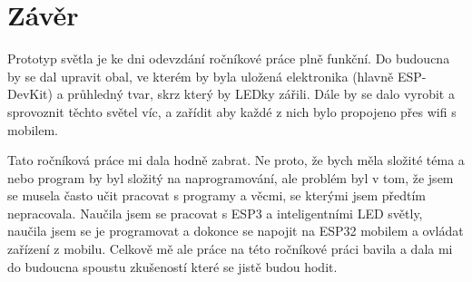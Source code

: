 \chapter{Závěr}
Prototyp světla je ke dni odevzdání ročníkové práce plně funkční. Do budoucna by se dal upravit obal, ve kterém by byla uložená elektronika (hlavně ESP-DevKit) a průhledný tvar, skrz který by LEDky zářili. Dále by se dalo vyrobit a sprovoznit těchto světel víc, a zařídit aby každé z nich bylo propojeno přes wifi s mobilem.


Tato ročníková práce mi dala hodně zabrat. Ne proto, že bych měla složité téma a nebo program by byl složitý na naprogramování, ale problém byl v tom, že jsem se musela často učit pracovat s programy a věcmi, se kterými jsem předtím nepracovala. Naučila jsem se pracovat s ESP3 a inteligentními LED světly, naučila jsem se je programovat a dokonce se napojit na ESP32 mobilem a ovládat zařízení z mobilu.
Celkově mě ale práce na této ročníkové práci bavila a dala mi do budoucna spoustu zkušeností které se jistě budou hodit. 



\newpage